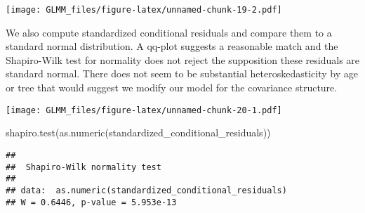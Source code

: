 \documentclass[
]{book}
\newenvironment{Shaded}{\begin{snugshade}}{\end{snugshade}}
\newcommand{\FunctionTok}[1]{\textcolor[rgb]{0.00,0.00,0.00}{#1}}
\newcommand{\NormalTok}[1]{#1}
\newcommand{\OtherTok}[1]{\textcolor[rgb]{0.56,0.35,0.01}{#1}}
\newcommand{\SpecialCharTok}[1]{\textcolor[rgb]{0.00,0.00,0.00}{#1}}
\begin{document}
\texttt{[image: GLMM\_files/figure-latex/unnamed-chunk-19-2.pdf]}

We also compute standardized conditional residuals and compare them to a standard normal distribution. A qq-plot suggests a reasonable match and the Shapiro-Wilk test for normality does not reject the supposition these residuals are standard normal. There does not seem to be substantial heteroskedasticity by age or tree that would suggest we modify our model for the covariance structure.

\begin{Shaded}
\end{Shaded}

\texttt{[image: GLMM\_files/figure-latex/unnamed-chunk-20-1.pdf]}

\begin{Shaded}
\begin{Highlighting}[]
\FunctionTok{shapiro.test}\NormalTok{(}\FunctionTok{as.numeric}\NormalTok{(standardized\_conditional\_residuals))}
\end{Highlighting}
\end{Shaded}

\begin{verbatim}
## 
##  Shapiro-Wilk normality test
## 
## data:  as.numeric(standardized_conditional_residuals)
## W = 0.6446, p-value = 5.953e-13
\end{verbatim}
\end{document}

